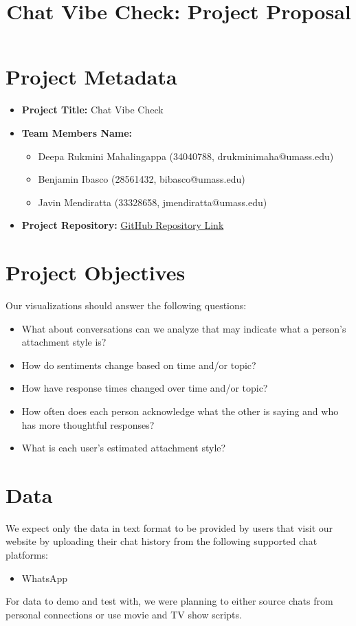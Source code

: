 \documentclass{article}\usepackage{graphicx}
\title{\textbf{Chat Vibe Check: Project Proposal}}
\begin{document}
\maketitle

\section{Project Metadata}
\begin{itemize}
    \item \textbf{Project Title:} Chat Vibe Check
    \item \textbf{Team Members Name:} 
    \begin{itemize}
        \item Deepa Rukmini Mahalingappa (34040788, drukminimaha@umass.edu)
        \item Benjamin Ibasco (28561432, bibasco@umass.edu)
        \item Javin Mendiratta (33328658, jmendiratta@umass.edu)
    \end{itemize}
   
    \item \textbf{Project Repository:} \href{https://github.com/bibascoumass/chat-vibe-check}{GitHub Repository Link}
\end{itemize}

\section*{Project Objectives}
Our visualizations should answer the following questions:
\begin{itemize}
    \item What about conversations can we analyze that may indicate what a person's attachment style is?
    \item How do sentiments change based on time and/or topic?
    \item How have response times changed over time and/or topic?
    \item How often does each person acknowledge what the other is saying and who has more thoughtful responses?
    \item What is each user's estimated attachment style?
\end{itemize}

\section*{Data}
We expect only the data in text format to be provided by users that visit our website by uploading their chat history from the following supported chat platforms:
\begin{itemize}
    \item WhatsApp
\end{itemize}
For data to demo and test with, we were planning to either source chats from personal connections or use movie and TV show scripts.
\end{document}
